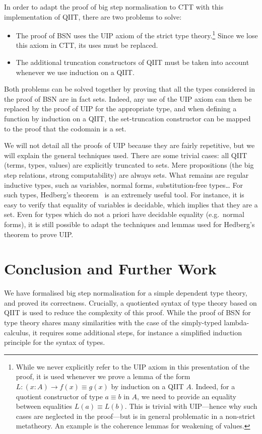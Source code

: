 \documentclass[a4paper,UKenglish,cleveref]{lipics-v2019}
\begin{document}
In order to adapt the proof of big step normalisation to CTT with this
implementation of QIIT, there are two problems to solve:
\begin{itemize}
\item The proof of BSN uses the UIP axiom of the strict type theory.\footnote{%
    While we never explicitly refer to the UIP axiom in this presentation of the
    proof, it is used whenever we prove a lemma of the form
    $L : (x : A) \to f(x) \equiv g(x)$ by induction on a QIIT $A$.
    Indeed, for a quotient constructor of type $a \equiv b$ in $A$, we need to
    provide an equality between equalities $L(a) \equiv L(b)$. This is trivial
    with UIP---hence why such cases are neglected in the proof---but is
    in general problematic in a non-strict metatheory.
    An example is the coherence lemmas for weakening of values.
  }
  Since we lose this axiom in CTT, its uses must be replaced.
\item The additional truncation constructors of QIIT must be taken into account
  whenever we use induction on a QIIT.
\end{itemize}
Both problems can be solved together by proving that all the types considered
in the proof of BSN are in fact sets.
Indeed, any use of the UIP axiom can then be replaced by the proof of UIP for
the appropriate type, and when defining a function by induction on a QIIT, the
set-truncation constructor can be mapped to the proof that the codomain is a set.

We will not detail all the proofs of UIP because they are fairly repetitive, but
we will explain the general techniques used.
There are some trivial cases: all QIIT (terms, types, values) are explicitly truncated to sets.
Mere propositions (the big step relations, strong computability) are always sets.
What remains are regular inductive types, such as variables, normal forms, substitution-free types\dots{}
For such types, Hedberg's theorem~\cite{hedberg1998coherence} is an extremely
useful tool. For instance, it is easy to verify that equality of variables is
decidable, which implies that they are a set. Even for types which do not a
priori have decidable equality (e.g.\ normal forms), it is still possible to
adapt the techniques and lemmas used for Hedberg's theorem to prove UIP.

\section{Conclusion and Further Work}
We have formalised big step normalisation for a simple dependent type theory,
and proved its correctness. Crucially, a quotiented syntax of type theory based
on QIIT is used to reduce the complexity of this proof. While the proof of BSN
for type theory shares many similarities with the case of the simply-typed
lambda-calculus, it requires some additional steps, for instance a simplified
induction principle for the syntax of types.
\end{document}
